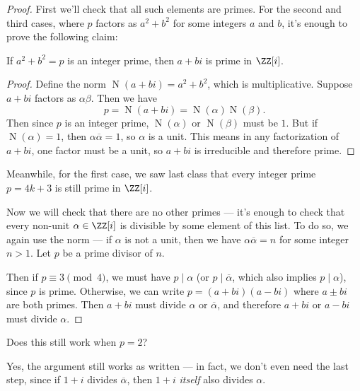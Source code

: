\begin{proof}
    First we'll check that all such elements are primes. For the second and third cases, where $p$ factors as $a^2 + b^2$ for some integers $a$ and $b$, it's enough to prove the following claim:

    \begin{claim*}
        If $a^2 + b^2 = p$ is an integer prime, then $a + bi$ is prime in $\ZZ[i]$. 
    \end{claim*}

    \begin{proof}
        Define the norm $\operatorname{N}(a + bi) = a^2 + b^2$, which is multiplicative. Suppose $a + bi$ factors as $\alpha\beta$. Then we have \[p = \operatorname{N}(a + bi) = \operatorname{N}(\alpha)\operatorname{N}(\beta).\] Then since $p$ is an integer prime, $\operatorname{N}(\alpha)$ or $\operatorname{N}(\beta)$ must be $1$. But if $\operatorname{N}(\alpha) = 1$, then $\alpha\overline{\alpha} = 1$, so $\alpha$ is a unit. This means in any factorization of $a + bi$, one factor must be a unit, so $a + bi$ is irreducible and therefore prime. 
    \end{proof}

    Meanwhile, for the first case, we saw last class that every integer prime $p = 4k + 3$ is still prime in $\ZZ[i]$. 

    Now we will check that there are no other primes --- it's enough to check that every non-unit $\alpha \in \ZZ[i]$ is divisible by some element of this list. To do so, we again use the norm --- if $\alpha$ is not a unit, then we have $\alpha\overline{\alpha} = n$ for some integer $n > 1$. Let $p$ be a prime divisor of $n$. 
    
    Then if $p \equiv 3 \pmod{4}$, we must have $p \mid \alpha$ (or $p \mid \overline{\alpha}$, which also implies $p \mid \alpha$), since $p$ is prime. Otherwise, we can write $p = (a + bi)(a - bi)$ where $a \pm bi$ are both primes. Then $a + bi$ must divide $\alpha$ or $\overline{\alpha}$, and therefore $a + bi$ or $a - bi$ must divide $\alpha$. 
\end{proof}

\begin{question}
Does this still work when $p = 2$?
\end{question}

\begin{ans}
Yes, the argument still works as written --- in fact, we don't even need the last step, since if $1 + i$ divides $\overline{\alpha}$, then $1 + i$ \emph{itself} also divides $\alpha$. 
\end{ans}

